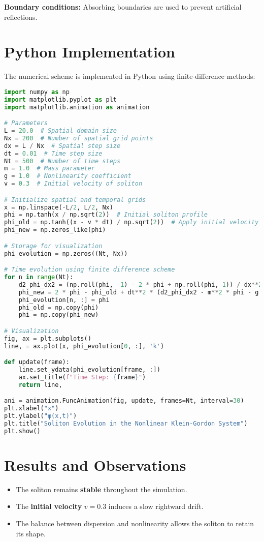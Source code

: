 \documentclass{article}
\begin{document}
\textbf{Boundary conditions:} Absorbing boundaries are used to prevent artificial reflections.

\section{Python Implementation}
The numerical scheme is implemented in Python using finite-difference methods:
\begin{lstlisting}[language=Python]
import numpy as np
import matplotlib.pyplot as plt
import matplotlib.animation as animation

# Parameters
L = 20.0  # Spatial domain size
Nx = 200  # Number of spatial grid points
dx = L / Nx  # Spatial step size
dt = 0.01  # Time step size
Nt = 500  # Number of time steps
m = 1.0  # Mass parameter
g = 1.0  # Nonlinearity coefficient
v = 0.3  # Initial velocity of soliton

# Initialize spatial and temporal grids
x = np.linspace(-L/2, L/2, Nx)
phi = np.tanh(x / np.sqrt(2))  # Initial soliton profile
phi_old = np.tanh((x - v * dt) / np.sqrt(2))  # Apply initial velocity shift
phi_new = np.zeros_like(phi)

# Storage for visualization
phi_evolution = np.zeros((Nt, Nx))

# Time evolution using finite difference scheme
for n in range(Nt):
    d2_phi_dx2 = (np.roll(phi, -1) - 2 * phi + np.roll(phi, 1)) / dx**2
    phi_new = 2 * phi - phi_old + dt**2 * (d2_phi_dx2 - m**2 * phi - g * phi**3)
    phi_evolution[n, :] = phi
    phi_old = np.copy(phi)
    phi = np.copy(phi_new)

# Visualization
fig, ax = plt.subplots()
line, = ax.plot(x, phi_evolution[0, :], 'k')

def update(frame):
    line.set_ydata(phi_evolution[frame, :])
    ax.set_title(f"Time Step: {frame}")
    return line,

ani = animation.FuncAnimation(fig, update, frames=Nt, interval=30)
plt.xlabel("x")
plt.ylabel("φ(x,t)")
plt.title("Soliton Evolution in the Nonlinear Klein-Gordon System")
plt.show()
\end{lstlisting}

\section{Results and Observations}
\begin{itemize}
    \item The soliton remains \textbf{stable} throughout the simulation.
    \item The \textbf{initial velocity} $ v = 0.3 $ induces a slow rightward drift.
    \item The balance between dispersion and nonlinearity allows the soliton to retain its shape.
\end{itemize}
\end{document}
